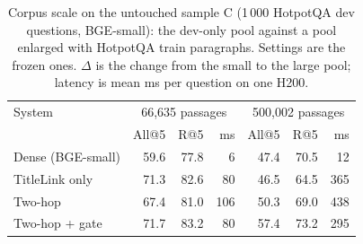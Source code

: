 \begin{table}[t]
\centering
\small
\caption{Corpus scale on the untouched sample C (1\,000 HotpotQA dev questions, BGE-small): the dev-only pool against a pool enlarged with HotpotQA train paragraphs. Settings are the frozen ones. $\Delta$ is the change from the small to the large pool; latency is mean ms per question on one H200.}
\label{tab:scale500}
\begin{tabular}{lrrrrrr}
\toprule
System & \multicolumn{3}{c}{66{,}635 passages} & \multicolumn{3}{c}{500{,}002 passages} \\
 & All@5 & R@5 & ms & All@5 & R@5 & ms \\
\midrule
Dense (BGE-small) & 59.6 & 77.8 & 6 & 47.4 & 70.5 & 12 \\
TitleLink only & 71.3 & 82.6 & 80 & 46.5 & 64.5 & 365 \\
Two-hop & 67.4 & 81.0 & 106 & 50.3 & 69.0 & 438 \\
Two-hop + gate & 71.7 & 83.2 & 80 & 57.4 & 73.2 & 295 \\
\bottomrule
\end{tabular}
\end{table}
